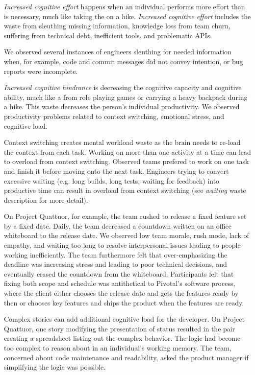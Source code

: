 \textit{Increased cognitive effort} happens when an individual performs more effort than is necessary, much like taking the  on a hike. \textit{Increased cognitive effort} includes the waste from sleuthing missing information, knowledge loss from team churn, suffering from technical debt, inefficient tools, and problematic APIs.

We observed several instances of engineers sleuthing for needed information when, for example, code and commit messages did not convey intention, or bug reports were incomplete. 
 

\textit{Increased cognitive hindrance} is decreasing the cognitive capacity and cognitive ability, much like a  from role playing games or carrying a heavy backpack during a hike. This waste decreases the person's individual productivity. We observed productivity problems related to context switching, emotional stress, and cognitive load.

Context switching creates mental workload waste as the brain needs to re-load the context from each task. Working on more than one activity at a time can lead to overload from context switching. Observed teams prefered to work on one task and finish it before moving onto the next task. Engineers trying to convert excessive waiting (e.g. long builds, long tests, waiting for feedback) into productive time can result in overload from context switching (see \textit{waiting} waste description for more detail).

On Project Quattuor, for example, the team rushed to release a fixed feature set by a fixed date. Daily, the team decreased a countdown written on an office whiteboard to the release date. We observed low team morale, rush mode, lack of empathy, and waiting too long to resolve interpersonal issues leading to people working inefficiently. The team furthermore felt that over-emphasizing the deadline was increasing stress and leading to poor technical decisions, and eventually erased the countdown from the whiteboard. Participants felt that fixing both scope and schedule was antithetical to Pivotal's software process, where the client either chooses the release date and gets the features ready by then or chooses key features and ships the product when the features are ready. 

Complex stories can add additional cognitive load for the developer. On Project Quattuor, one story modifying the presentation of status resulted in the pair creating a spreadsheet listing out the complex behavior. The logic had become too complex to reason about in an individual's working memory. The team, concerned about code maintenance and readability, asked the product manager if simplifying the logic was possible. 

